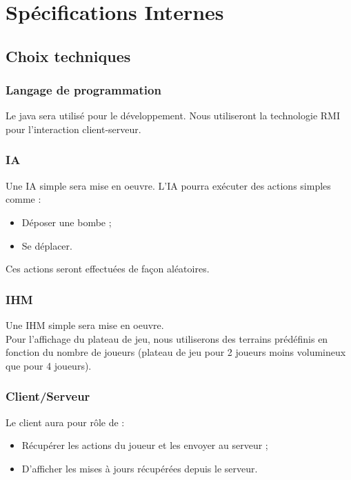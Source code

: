 \section{Spécifications Internes }

\subsection{Choix techniques}

    \subsubsection{Langage de programmation}

Le java sera utilisé pour le développement. Nous utiliseront la technologie RMI pour l'interaction client-serveur.

    \subsubsection{IA}

Une IA simple sera mise en oeuvre. L'IA pourra exécuter des actions simples comme :
\begin{itemize}
	\item Déposer une bombe ;
	\item Se déplacer.
\end{itemize}
Ces actions seront effectuées de façon aléatoires.

    \subsubsection{IHM}

Une IHM simple sera mise en oeuvre.\\

Pour l'affichage du plateau de jeu, nous utiliserons des terrains prédéfinis en fonction du nombre de joueurs (plateau de jeu pour 2 joueurs moins volumineux que pour 4 joueurs).

   \subsubsection{Client/Serveur}

Le client aura pour rôle de :
\begin{itemize}
	\item Récupérer les actions du joueur et les envoyer au serveur ;
	\item D'afficher les mises à jours récupérées depuis le serveur.
\end{itemize}

